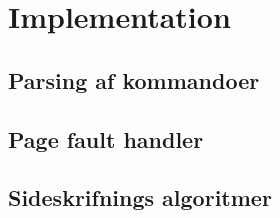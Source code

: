 \section{Implementation}

\subsection{Parsing af kommandoer}

\subsection{Page fault handler}

\subsection{Sideskrifnings algoritmer}
